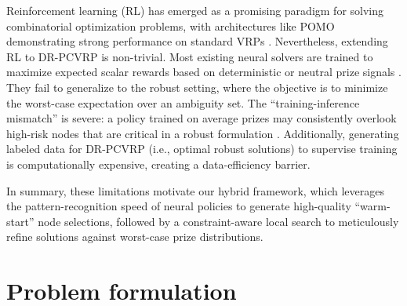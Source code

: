 \documentclass[preprint,12pt,authoryear]{elsarticle}
\theoremstyle{definition}
\begin{document}
Reinforcement learning (RL) has emerged as a promising paradigm for solving combinatorial optimization problems, with architectures like POMO demonstrating strong performance on standard VRPs \citep{wang2024deep,lin2021deep,xiao2026deep}. Nevertheless, extending RL to DR-PCVRP is non-trivial. Most existing neural solvers are trained to maximize expected scalar rewards based on deterministic or neutral prize signals \citep{zhang2020multi}. They fail to generalize to the robust setting, where the objective is to minimize the worst-case expectation over an ambiguity set. The ``training-inference mismatch'' is severe: a policy trained on average prizes may consistently overlook high-risk nodes that are critical in a robust formulation \citep{peng2025multi,zhao2026discriminatory}. Additionally, generating labeled data for DR-PCVRP (i.e., optimal robust solutions) to supervise training is computationally expensive, creating a data-efficiency barrier.

In summary, these limitations motivate our hybrid framework, which leverages the pattern-recognition speed of neural policies to generate high-quality ``warm-start'' node selections, followed by a constraint-aware local search to meticulously refine solutions against worst-case prize distributions.





\section{Problem formulation}\label{sec3}
\end{document}
